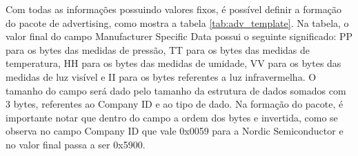 Com todas as informações possuindo valores fixos, é possível definir a formação
do pacote de advertising, como mostra a tabela \ref{tab:adv_template}. Na
tabela, o valor final do campo Manufacturer Specific Data possui o seguinte
significado: PP para os bytes das medidas de pressão, TT para os bytes das
medidas de temperatura, HH para os bytes das medidas de umidade, VV para os
bytes das medidas de luz visível e II para os bytes referentes a luz
infravermelha. O tamanho do campo será dado pelo tamanho da estrutura de dados
somados com 3 bytes, referentes ao Company ID e ao tipo de dado. Na formação do
pacote, é importante notar que dentro do campo a ordem dos bytes e invertida,
como se observa no campo Company ID que vale 0x0059\cite{bleCompanyIds} para a Nordic
Semiconductor e no valor final passa a ser 0x5900.

\begin{table}[H]
\centering
{}
\caption{Formato do pacote de advertising}
\label{tab:adv_template}
\end{table}

